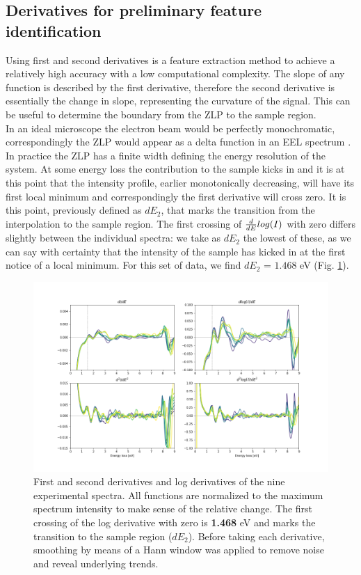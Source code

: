 \documentclass[11pt,a4paper]{article}
\def\frac#1#2{{{#1}\over {#2}}}
\numberwithin{equation}{section}
\numberwithin{figure}{section}
\numberwithin{table}{section}
\begin{document}
\subsection{Derivatives for preliminary feature identification}

Using first and second derivatives is a feature extraction method to achieve a relatively high accuracy with a low computational complexity. The slope of any function is described by the first derivative, therefore the second derivative is essentially the change in slope, representing the curvature of the signal. This can be useful to determine the boundary from the ZLP to the sample region. \\

In an ideal microscope the electron beam would be perfectly monochromatic, correspondingly the ZLP would appear as a delta function in an EEL spectrum \cite{rafferty}. In practice the ZLP has a finite width defining the energy resolution of the system. At some energy loss the contribution to the sample kicks in and it is at this point that the intensity profile, earlier monotonically decreasing, will have its first local minimum and correspondingly the first derivative will cross zero. It is this point, previously defined as $dE_2$, that marks the transition from the interpolation to the sample region. The first crossing of $\frac{d}{dE}log(I)$ with zero differs slightly between the individual spectra: we take as $dE_2$ the lowest of these, as we can say with certainty that the intensity of the sample has kicked in at the first notice of a local minimum. For this set of data, we find $dE_2$ = $1.468$ eV (Fig. \ref{bound}). 

\begin{figure}[H]
    \centering 
    \includegraphics[width=170mm]{plots/derivatives.png}
    \caption{First and second derivatives and log derivatives of the nine experimental spectra. All functions are normalized to the maximum spectrum intensity to make sense of the relative change. The first crossing of the log derivative with zero is \textbf{1.468} eV and marks the transition to the sample region ($dE_2$). Before taking each derivative, smoothing by means of a Hann window \cite{hann} was applied to remove noise and reveal underlying trends. }
    \label{bound}
\end{figure}
\end{document}
